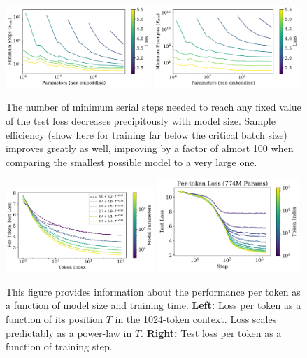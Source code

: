 \documentclass[english]{article}
\begin{document}
\begin{figure}
\noindent \centering{}
\includegraphics[width=0.49\textwidth]{SampleEfficiencystep_min}
\includegraphics[width=0.49\textwidth]{SampleEfficiencyexamples_min}
\caption[Another look at sample efficiency]{The number of minimum serial steps needed to reach any fixed value of the test loss decreases precipitously with model size.  Sample efficiency (show here for training far below the critical batch size) improves greatly as well, improving by a factor of almost 100 when comparing the smallest possible model to a very large one.   \label{fig:SampleEfficiency}}
\end{figure} 

\begin{figure}
\noindent \centering{} \includegraphics[width=0.50\textwidth]{ContextPowerLaw} 
\includegraphics[width=0.48\textwidth]{SingleRunTokenTraining}  \caption[Power-law dependence of performance on position in context]{ This figure provides information about the performance per token as a function of model size and training time.  {\bf Left:} Loss per token as a function of its position $T$ in the 1024-token context.  Loss scales predictably as a power-law in $T$.  {\bf Right: } Test loss per token as a function of training step.  \label{fig:MoreTokenAnalysis}}
\end{figure}
\end{document}
